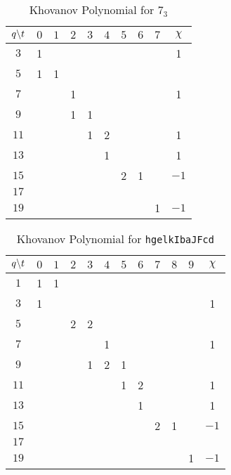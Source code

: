    \begin{table}
        \centering
        \begin{tabular}{| c | c | c | c | c | c | c | c | c | c |}
            \hline
            $q\symbol{92}t$&$0$&$1$&$2$&$3$&$4$&$5$&$6$&$7$&$\chi$\\
            \hline
            $3$&1&&&&&&&&1\\
            \hline
            $5$&1&1&&&&&&&\\
            \hline
            $7$&&&1&&&&&&1\\
            \hline
            $9$&&&1&1&&&&&\\
            \hline
            $11$&&&&1&2&&&&1\\
            \hline
            $13$&&&&&1&&&&1\\
            \hline
            $15$&&&&&&2&1&&$-1$\\
            \hline
            $17$&&&&&&&&&\\
            \hline
            $19$&&&&&&&&1&$-1$\\
            \hline
        \end{tabular}
        \caption{Khovanov Polynomial for $7_{3}$}
    \end{table}
    \begin{table}
        \centering
        \begin{tabular}{| c | c | c | c | c | c | c | c | c | c | c | c |}
            \hline
            $q\symbol{92}t$&$0$&$1$&$2$&$3$&$4$&$5$&$6$&$7$&$8$&$9$&$\chi$\\
            \hline
            $1$&1&1&&&&&&&&&\\
            \hline
            $3$&1&&&&&&&&&&1\\
            \hline
            $5$&&&2&2&&&&&&&\\
            \hline
            $7$&&&&&1&&&&&&1\\
            \hline
            $9$&&&&1&2&1&&&&&\\
            \hline
            $11$&&&&&&1&2&&&&1\\
            \hline
            $13$&&&&&&&1&&&&1\\
            \hline
            $15$&&&&&&&&2&1&&$-1$\\
            \hline
            $17$&&&&&&&&&&&\\
            \hline
            $19$&&&&&&&&&&1&$-1$\\
            \hline
        \end{tabular}
        \caption{Khovanov Polynomial for \texttt{hgelkIbaJFcd}}
    \end{table}
